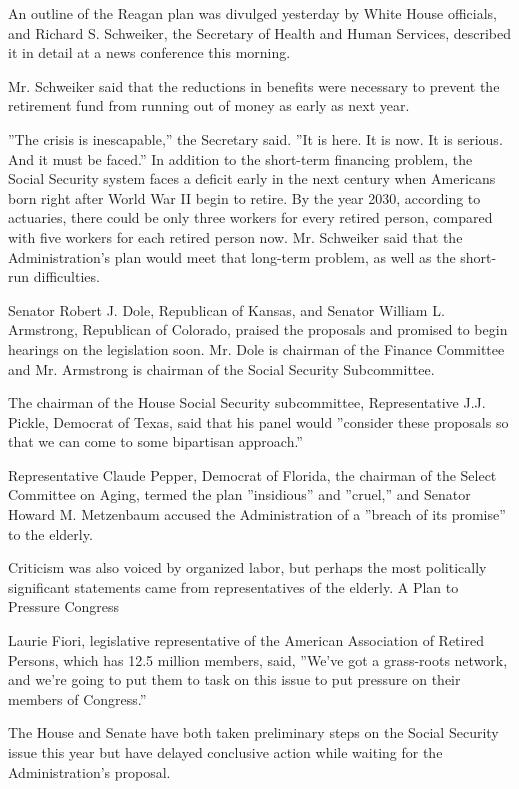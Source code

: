 An outline of the Reagan plan was divulged yesterday by White House
officials, and Richard S. Schweiker, the Secretary of Health and Human
Services, described it in detail at a news conference this morning.

Mr. Schweiker said that the reductions in benefits were necessary to
prevent the retirement fund from running out of money as early as next
year.

''The crisis is inescapable,'' the Secretary said. ''It is here. It is
now. It is serious. And it must be faced.'' In addition to the
short-term financing problem, the Social Security system faces a deficit
early in the next century when Americans born right after World War II
begin to retire. By the year 2030, according to actuaries, there could
be only three workers for every retired person, compared with five
workers for each retired person now. Mr. Schweiker said that the
Administration's plan would meet that long-term problem, as well as the
short-run difficulties.

Senator Robert J. Dole, Republican of Kansas, and Senator William L.
Armstrong, Republican of Colorado, praised the proposals and promised to
begin hearings on the legislation soon. Mr. Dole is chairman of the
Finance Committee and Mr. Armstrong is chairman of the Social Security
Subcommittee.

The chairman of the House Social Security subcommittee, Representative
J.J. Pickle, Democrat of Texas, said that his panel would ''consider
these proposals so that we can come to some bipartisan approach.''

Representative Claude Pepper, Democrat of Florida, the chairman of the
Select Committee on Aging, termed the plan ''insidious'' and ''cruel,''
and Senator Howard M. Metzenbaum accused the Administration of a
''breach of its promise'' to the elderly.

Criticism was also voiced by organized labor, but perhaps the most
politically significant statements came from representatives of the
elderly. A Plan to Pressure Congress

Laurie Fiori, legislative representative of the American Association of
Retired Persons, which has 12.5 million members, said, ''We've got a
grass-roots network, and we're going to put them to task on this issue
to put pressure on their members of Congress.''

The House and Senate have both taken preliminary steps on the Social
Security issue this year but have delayed conclusive action while
waiting for the Administration's proposal.

